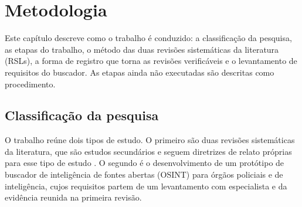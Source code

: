 
\begingroup
\setlength{\emergencystretch}{3em}

\chapter{Metodologia}
\label{cap:metodologia}

Este capítulo descreve como o trabalho é conduzido: a classificação da
pesquisa, as etapas do trabalho, o método das duas revisões sistemáticas da
literatura (RSLs), a forma de registro que torna as revisões verificáveis e o
levantamento de requisitos do buscador. As etapas ainda não executadas são
descritas como procedimento.

\section{Classificação da pesquisa}
\label{sec:metodologia-classificacao}


O trabalho reúne dois tipos de estudo. O primeiro são duas revisões
sistemáticas da literatura, que são estudos secundários e seguem diretrizes de
relato próprias para esse tipo de estudo
\cite{page2021prisma,kitchenham2023segress}. O segundo é o desenvolvimento de
um protótipo de buscador de inteligência de fontes abertas (OSINT) para órgãos
policiais e de inteligência, cujos requisitos partem de um levantamento com
especialista e da evidência reunida na primeira revisão.

